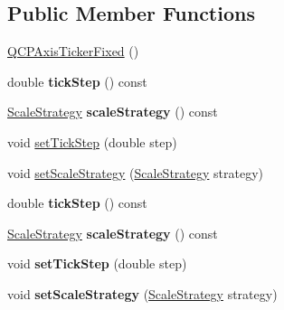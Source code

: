\subsection*{Public Member Functions}
\begin{DoxyCompactItemize}
\item 
\hyperlink{class_q_c_p_axis_ticker_fixed_a96d2b053a15f9b8e94550c3efeff6a34}{Q\+C\+P\+Axis\+Ticker\+Fixed} ()
\item 
double {\bfseries tick\+Step} () const \hypertarget{class_q_c_p_axis_ticker_fixed_a69e2dbe18a3fbc4108c7ea109fa5d3da}{}\label{class_q_c_p_axis_ticker_fixed_a69e2dbe18a3fbc4108c7ea109fa5d3da}

\item 
\hyperlink{class_q_c_p_axis_ticker_fixed_a15b3d38b935d404b1311eb85cfb6a439}{Scale\+Strategy} {\bfseries scale\+Strategy} () const \hypertarget{class_q_c_p_axis_ticker_fixed_ab9cc237725db85b932dc6f3dd08b93fa}{}\label{class_q_c_p_axis_ticker_fixed_ab9cc237725db85b932dc6f3dd08b93fa}

\item 
void \hyperlink{class_q_c_p_axis_ticker_fixed_a4bc83d85a4f81d4abdd3fa5042d7b833}{set\+Tick\+Step} (double step)
\item 
void \hyperlink{class_q_c_p_axis_ticker_fixed_acbc7c9bcd80b3dc3edee5f0519d301f6}{set\+Scale\+Strategy} (\hyperlink{class_q_c_p_axis_ticker_fixed_a15b3d38b935d404b1311eb85cfb6a439}{Scale\+Strategy} strategy)
\item 
double {\bfseries tick\+Step} () const \hypertarget{class_q_c_p_axis_ticker_fixed_a69e2dbe18a3fbc4108c7ea109fa5d3da}{}\label{class_q_c_p_axis_ticker_fixed_a69e2dbe18a3fbc4108c7ea109fa5d3da}

\item 
\hyperlink{class_q_c_p_axis_ticker_fixed_a15b3d38b935d404b1311eb85cfb6a439}{Scale\+Strategy} {\bfseries scale\+Strategy} () const \hypertarget{class_q_c_p_axis_ticker_fixed_ab9cc237725db85b932dc6f3dd08b93fa}{}\label{class_q_c_p_axis_ticker_fixed_ab9cc237725db85b932dc6f3dd08b93fa}

\item 
void {\bfseries set\+Tick\+Step} (double step)\hypertarget{class_q_c_p_axis_ticker_fixed_a4bc83d85a4f81d4abdd3fa5042d7b833}{}\label{class_q_c_p_axis_ticker_fixed_a4bc83d85a4f81d4abdd3fa5042d7b833}

\item 
void {\bfseries set\+Scale\+Strategy} (\hyperlink{class_q_c_p_axis_ticker_fixed_a15b3d38b935d404b1311eb85cfb6a439}{Scale\+Strategy} strategy)\hypertarget{class_q_c_p_axis_ticker_fixed_acbc7c9bcd80b3dc3edee5f0519d301f6}{}\label{class_q_c_p_axis_ticker_fixed_acbc7c9bcd80b3dc3edee5f0519d301f6}

\end{DoxyCompactItemize}
